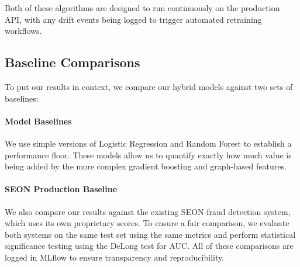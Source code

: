 Both of these algorithms are designed to run continuously on the production API, with any drift events being logged to trigger automated retraining workflows.

\subsection{Baseline Comparisons}
\label{sec:4_8_4}

To put our results in context, we compare our hybrid models against two sets of baselines:

\paragraph{Model Baselines}
We use simple versions of Logistic Regression and Random Forest to establish a performance floor. These models allow us to quantify exactly how much value is being added by the more complex gradient boosting and graph-based features.

\paragraph{SEON Production Baseline}
We also compare our results against the existing SEON fraud detection system, which uses its own proprietary scores. To ensure a fair comparison, we evaluate both systems on the same test set using the same metrics and perform statistical significance testing using the DeLong test for AUC. All of these comparisons are logged in MLflow to ensure transparency and reproducibility.
